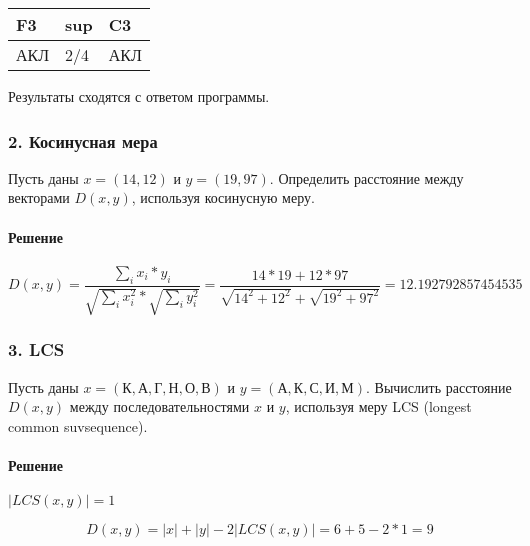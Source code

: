 \documentclass[
]{article}
\begin{document}
\begin{longtable}[]{@{}lll@{}}
\toprule
F3 & sup & C3\tabularnewline
\midrule
\endhead
АКЛ & 2/4 & АКЛ\tabularnewline
\bottomrule
\end{longtable}

Результаты сходятся с ответом программы.

\hypertarget{ux43aux43eux441ux438ux43dux443ux441ux43dux430ux44f-ux43cux435ux440ux430}{%
\subsubsection{2. Косинусная
мера}\label{ux43aux43eux441ux438ux43dux443ux441ux43dux430ux44f-ux43cux435ux440ux430}}

Пусть даны \(x=(14, 12)\) и \(y=(19,97)\). Определить расстояние между
векторами \(D(x,y)\), используя косинусную меру.

\hypertarget{ux440ux435ux448ux435ux43dux438ux435}{%
\paragraph{Решение}\label{ux440ux435ux448ux435ux43dux438ux435}}

\[ 
D(x,y) = \frac{\sum_{i} x_i*y_i}{\sqrt{\sum_{i}x_i^2} * \sqrt{\sum_{i}y_i^2}} = \frac{14*19 + 12*97}{\sqrt{14^2 + 12^2} + \sqrt{19^2 + 97^2}} = 12.192792857454535
\]

\hypertarget{lcs}{%
\subsubsection{3. LCS}\label{lcs}}

Пусть даны \(x=(К,А,Г,Н,О,В)\) и \(y=(А,К,С,И,М)\). Вычислить расстояние
\(D(x,y)\) между последовательностями \(x\) и \(y\), используя меру LCS
(longest common suvsequence).

\hypertarget{ux440ux435ux448ux435ux43dux438ux435-1}{%
\paragraph{Решение}\label{ux440ux435ux448ux435ux43dux438ux435-1}}

\(|LCS(x,y)|=1\)

\[
D(x,y) = |x| + |y| - 2|LCS(x,y)| = 6 + 5 - 2*1 = 9
\]
\end{document}
